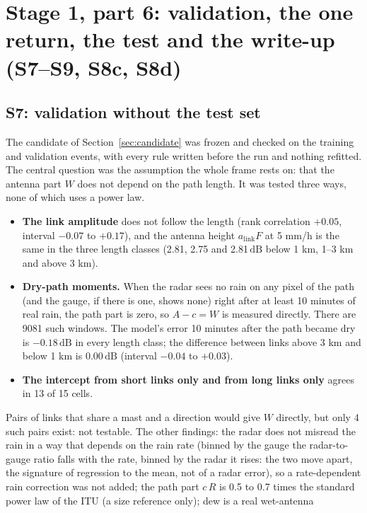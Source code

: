 \documentclass[11pt,a4paper]{article}
\newcommand{\dB}{\,\mathrm{dB}}
\begin{document}
\section{Stage 1, part 6: validation, the one return, the test and the write-up (S7--S9, S8c, S8d)}
\label{sec:validate}

\subsection{S7: validation without the test set}
\label{sec:s7}

The candidate of Section~\ref{sec:candidate} was frozen and checked on the training and validation events, with every
rule written before the run and nothing refitted. The central question was the assumption the whole frame rests on:
that the antenna part $W$ does not depend on the path length. It was tested three ways, none of which uses a power law.
\begin{itemize}
\item \textbf{The link amplitude} does not follow the length (rank correlation $+0.05$, interval $-0.07$ to $+0.17$),
and the antenna height $a_{\mathrm{link}}F$ at 5 mm/h is the same in the three length classes (2.81, 2.75 and
2.81$\dB$ below 1 km, 1--3 km and above 3 km).
\item \textbf{Dry-path moments.} When the radar sees no rain on any pixel of the path (and the gauge, if there is one,
shows none) right after at least 10 minutes of real rain, the path part is zero, so $A - c = W$ is measured directly.
There are 9081 such windows. The model's error 10 minutes after the path became dry is $-0.18\dB$ in every length
class; the difference between links above 3 km and below 1 km is $0.00\dB$ (interval $-0.04$ to $+0.03$).
\item \textbf{The intercept from short links only and from long links only} agrees in 13 of 15 cells.
\end{itemize}
Pairs of links that share a mast and a direction would give $W$ directly, but only 4 such pairs exist: not testable.
The other findings: the radar does not misread the rain in a way that depends on the rain rate (binned by the gauge
the radar-to-gauge ratio falls with the rate, binned by the radar it rises: the two move apart, the signature of
regression to the mean, not of a radar error), so a rate-dependent rain correction was not added; the path part
$c\,R$ is 0.5 to 0.7 times the standard power law of the ITU (a size reference only); dew is a real wet-antenna
\end{document}
